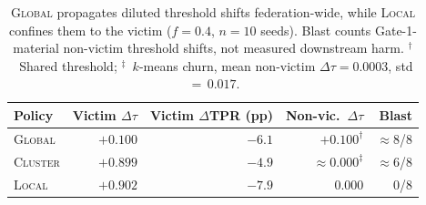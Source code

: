 \begin{table}[!ht]
\caption{\textsc{Global} propagates diluted threshold shifts federation-wide, while \textsc{Local} confines them to the victim ($f{=}0.4$, $n{=}10$ seeds).
Blast counts Gate-1-material non-victim threshold shifts, not measured downstream harm.
$^{\dagger}$~Shared threshold; $^{\ddagger}$~$k$-means churn, mean non-victim $\Delta\tau{=}0.0003$, std$\,{=}\,0.017$.}
\label{tab:spillover}
\centering
\footnotesize
\setlength{\tabcolsep}{4pt}
\begin{tabular}{@{}lrrrr@{}}
\toprule
Policy & Victim $\Delta\tau$ & Victim $\Delta$TPR (pp) & Non-vic.\ $\Delta\tau$ & Blast \\
\midrule
\textsc{Global} & $+0.100$ & $-6.1$ & $+0.100^{\dagger}$ & $\approx$8/8 \\
\textsc{Cluster} & $+0.899$ & $-4.9$ & $\approx\!0.000^{\ddagger}$ & $\approx$6/8 \\
\textsc{Local}   & $+0.902$ & $-7.9$ & $0.000$ & 0/8 \\
\bottomrule
\end{tabular}
\end{table}
